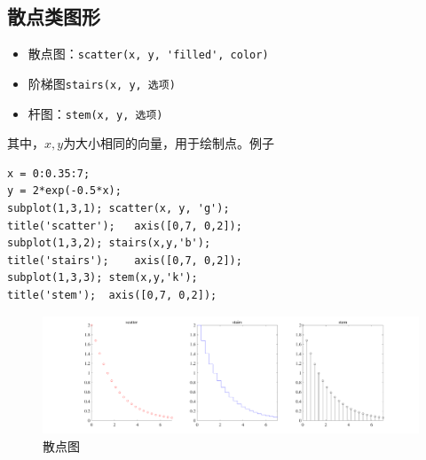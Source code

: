 \subsection{散点类图形}
\begin{itemize}
	\item 散点图：\lstinline|scatter(x, y, 'filled', color)|
	\item 阶梯图\lstinline|stairs(x, y, 选项)|
	\item 杆图：\lstinline|stem(x, y, 选项)|
\end{itemize}
其中，$x,y$为大小相同的向量，用于绘制点。例子
\begin{lstlisting}
x = 0:0.35:7;
y = 2*exp(-0.5*x);
subplot(1,3,1);	scatter(x, y, 'g');
title('scatter');	axis([0,7, 0,2]);
subplot(1,3,2); stairs(x,y,'b');
title('stairs');	axis([0,7, 0,2]);
subplot(1,3,3);	stem(x,y,'k');
title('stem');	axis([0,7, 0,2]);
\end{lstlisting}
\begin{figure}[!htb]
	\centering
	\includegraphics[width=\linewidth]{pic/散点图.pdf}
	\caption{散点图}
\end{figure}

